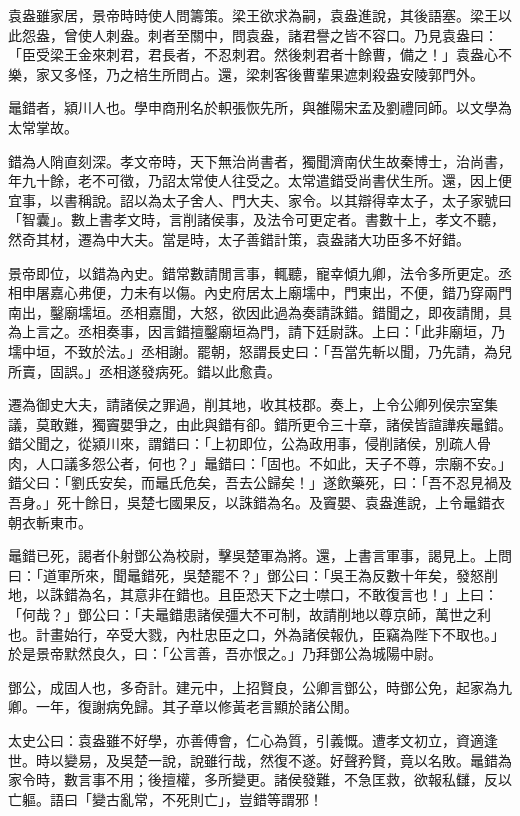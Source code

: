 \begin{pinyinscope}
袁盎雖家居，景帝時時使人問籌策。梁王欲求為嗣，袁盎進說，其後語塞。梁王以此怨盎，曾使人刺盎。刺者至關中，問袁盎，諸君譽之皆不容口。乃見袁盎曰：「臣受梁王金來刺君，君長者，不忍刺君。然後刺君者十餘曹，備之！」袁盎心不樂，家又多怪，乃之棓生所問占。還，梁刺客後曹輩果遮刺殺盎安陵郭門外。

鼂錯者，潁川人也。學申商刑名於軹張恢先所，與雒陽宋孟及劉禮同師。以文學為太常掌故。

錯為人陗直刻深。孝文帝時，天下無治尚書者，獨聞濟南伏生故秦博士，治尚書，年九十餘，老不可徵，乃詔太常使人往受之。太常遣錯受尚書伏生所。還，因上便宜事，以書稱說。詔以為太子舍人、門大夫、家令。以其辯得幸太子，太子家號曰「智囊」。數上書孝文時，言削諸侯事，及法令可更定者。書數十上，孝文不聽，然奇其材，遷為中大夫。當是時，太子善錯計策，袁盎諸大功臣多不好錯。

景帝即位，以錯為內史。錯常數請閒言事，輒聽，寵幸傾九卿，法令多所更定。丞相申屠嘉心弗便，力未有以傷。內史府居太上廟壖中，門東出，不便，錯乃穿兩門南出，鑿廟壖垣。丞相嘉聞，大怒，欲因此過為奏請誅錯。錯聞之，即夜請閒，具為上言之。丞相奏事，因言錯擅鑿廟垣為門，請下廷尉誅。上曰：「此非廟垣，乃壖中垣，不致於法。」丞相謝。罷朝，怒謂長史曰：「吾當先斬以聞，乃先請，為兒所賣，固誤。」丞相遂發病死。錯以此愈貴。

遷為御史大夫，請諸侯之罪過，削其地，收其枝郡。奏上，上令公卿列侯宗室集議，莫敢難，獨竇嬰爭之，由此與錯有卻。錯所更令三十章，諸侯皆諠譁疾鼂錯。錯父聞之，從潁川來，謂錯曰：「上初即位，公為政用事，侵削諸侯，別疏人骨肉，人口議多怨公者，何也？」鼂錯曰：「固也。不如此，天子不尊，宗廟不安。」錯父曰：「劉氏安矣，而鼂氏危矣，吾去公歸矣！」遂飲藥死，曰：「吾不忍見禍及吾身。」死十餘日，吳楚七國果反，以誅錯為名。及竇嬰、袁盎進說，上令鼂錯衣朝衣斬東市。

鼂錯已死，謁者仆射鄧公為校尉，擊吳楚軍為將。還，上書言軍事，謁見上。上問曰：「道軍所來，聞鼂錯死，吳楚罷不？」鄧公曰：「吳王為反數十年矣，發怒削地，以誅錯為名，其意非在錯也。且臣恐天下之士噤口，不敢復言也！」上曰：「何哉？」鄧公曰：「夫鼂錯患諸侯彊大不可制，故請削地以尊京師，萬世之利也。計畫始行，卒受大戮，內杜忠臣之口，外為諸侯報仇，臣竊為陛下不取也。」於是景帝默然良久，曰：「公言善，吾亦恨之。」乃拜鄧公為城陽中尉。

鄧公，成固人也，多奇計。建元中，上招賢良，公卿言鄧公，時鄧公免，起家為九卿。一年，復謝病免歸。其子章以修黃老言顯於諸公閒。

太史公曰：袁盎雖不好學，亦善傅會，仁心為質，引義慨。遭孝文初立，資適逢世。時以變易，及吳楚一說，說雖行哉，然復不遂。好聲矜賢，竟以名敗。鼂錯為家令時，數言事不用；後擅權，多所變更。諸侯發難，不急匡救，欲報私讎，反以亡軀。語曰「變古亂常，不死則亡」，豈錯等謂邪！


\end{pinyinscope}